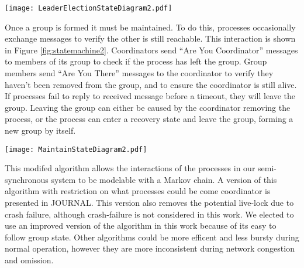 \begin{figure*}[!t]
\texttt{[image: LeaderElectionStateDiagram2.pdf]}
\caption{State machine of a leader election. Processes start as coordinators in the ``Normal'' state and search for other coordinators to join with. Processes immediately respond to ``Are You Coordinator'' (AYC) messages they receive. The algorithm was modified by adding a ``Ready Acknowledgment'' message as the final step of completing the election. Additionally, processes only accept invites if they have received an ``AYC Response'' message from the inviting process.}
\label{fig:statemachine}
\end{figure*}

Once a group is formed it must be maintained.
To do this, processes occasionally exchange messages to verify the other is still reachable.
This interaction is shown in Figure \ref{fig:statemachine2}.
Coordinators send ``Are You Coordinator'' messages to members of its group to check if the process has left the group.
Group members send ``Are You There'' messages to the coordinator to verify they haven't been removed from the group, and to ensure the coordinator is still alive.
If processes fail to reply to received message before a timeout, they will leave the group.
Leaving the group can either be caused by the coordinator removing the process, or the process can enter a recovery state and leave the group, forming a new group by itself.

\begin{figure*}[!t]
\texttt{[image: MaintainStateDiagram2.pdf]}
\caption{State machine of maintaining a group. The ``Are You Coordinator'' (AYC) messages are the same as those in Figure \ref{fig:statemachine}. AYC and ``Are You There'' (AYT) are periodically sent by processes, and responses to those messages are immediately sent by the receiving process. In the modified algorithm, the member does not enter the recovery state if they do not receive an AYT response before the timeout expires.}
\label{fig:statemachine2}
\end{figure*}

This modifed algorithm allows the interactions of the processes in our semi-synchronous system to be modelable with a Markov chain.
A version of this algorithm with restriction on what processes could be come coordinator is presented in JOURNAL.
This version also removes the potential live-lock due to crash failure, although crash-failure is not considered in this work.
We elected to use an improved version of the algorithm in this work because of its easy to follow group state.
Other algorithms could be more efficent and less bursty during normal operation, however they are more inconsistent during network congestion and omission.

